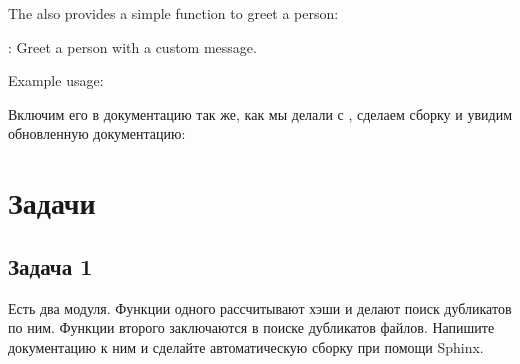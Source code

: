 \documentclass[letterpaper,10pt,russian]{sphinxmanual}
\begin{document}
\begin{sphinxVerbatim}[commandchars=\\\{\}]
      
      


The  also provides a simple function to greet a person:

 : Greet a person with a custom message.

Example usage:

  

      

     
     
\end{sphinxVerbatim}

\sphinxAtStartPar
Включим его в документацию так же, как мы делали с , сделаем сборку  и увидим обновленную документацию:

\sphinxAtStartPar
{}

\sphinxstepscope


\section{Задачи}
\label{\detokenize{educational_materials/docs/exercises:id1}}\label{\detokenize{educational_materials/docs/exercises::doc}}

\subsection{Задача 1}
\label{\detokenize{educational_materials/docs/exercises:id2}}
\sphinxAtStartPar
Есть два модуля. Функции одного рассчитывают хэши и делают поиск дубликатов по ним. Функции второго заключаются в поиске дубликатов файлов. Напишите документацию к ним и сделайте автоматическую сборку при помощи Sphinx.
\end{document}
